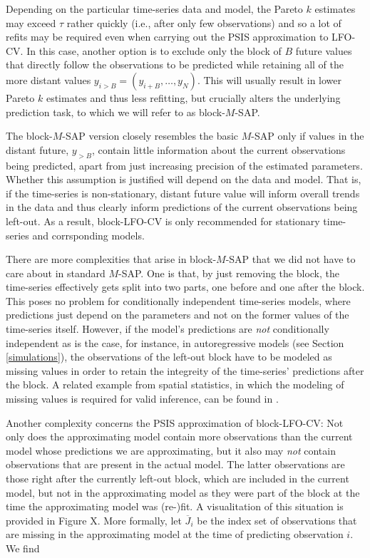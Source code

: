 \documentclass[american,]{article}
\begin{document}
Depending on the particular time-series data and model, the Pareto \(k\) estimates
may exceed \(\tau\) rather quickly (i.e., after only few observations) and so
a lot of refits may be required even when carrying out the PSIS approximation
to LFO-CV. In this case, another option is to exclude only the block of \(B\)
future values that directly follow the observations to be predicted while
retaining all of the more distant values \(y_{i>B} = (y_{i + B}, \ldots, y_N)\).
This will usually result in lower Pareto \(k\) estimates and thus less refitting,
but crucially alters the underlying prediction task, to which we will refer
to as block-\(M\)-SAP.

The block-\(M\)-SAP version closely resembles the basic \(M\)-SAP only if values in
the distant future, \(y_{>B}\), contain little information about the current
observations being predicted, apart from just increasing precision of the
estimated parameters. Whether this assumption is justified will depend
on the data and model. That is, if the time-series is non-stationary, distant
future value will inform overall trends in the data and thus clearly inform
predictions of the current observations being left-out. As a result,
block-LFO-CV is only recommended for stationary time-series and corrsponding
models.

There are more complexities that arise in block-\(M\)-SAP that we did not have to
care about in standard \(M\)-SAP. One is that, by just removing the block, the
time-series effectively gets split into two parts, one before and one after the
block. This poses no problem for conditionally independent time-series models,
where predictions just depend on the parameters and not on the former values of
the time-series itself. However, if the model's predictions are \emph{not}
conditionally independent as is the case, for instance, in autoregressive models
(see Section \ref{simulations}), the observations of the left-out block have to
be modeled as missing values in order to retain the integreity of the
time-series' predictions after the block. A related example from spatial
statistics, in which the modeling of missing values is required for valid
inference, can be found in \citet{buerkner:non-factorizable}.

Another complexity concerns the PSIS approximation of block-LFO-CV: Not only
does the approximating model contain more observations than the current model
whose predictions we are approximating, but it also may \emph{not} contain
observations that are present in the actual model. The latter observations are
those right after the currently left-out block, which are included in the
current model, but not in the approximating model as they were part of the block
at the time the approximating model was (re-)fit. A visualitation of this
situation is provided in Figure X. More formally, let \(\overline{J}_i\) be the
index set of observations that are missing in the approximating model at the
time of predicting observation \(i\). We find
\end{document}
